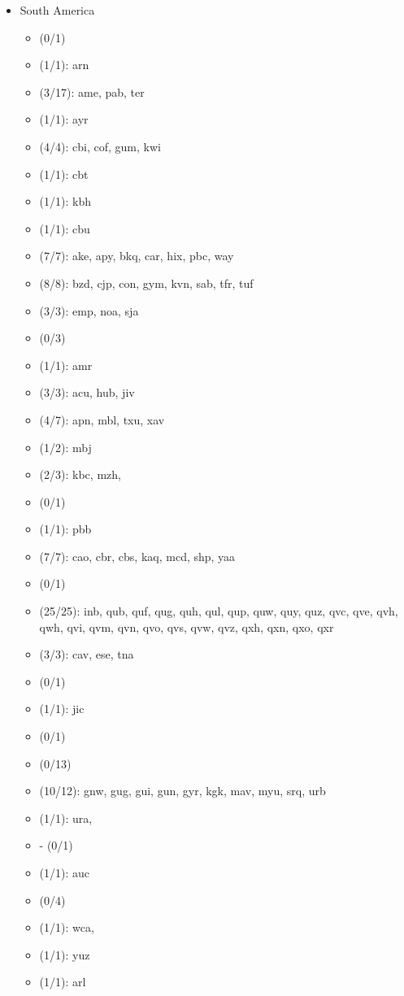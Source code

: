 \begin{itemize}[label={},leftmargin=0cm,labelindent=5pt,itemindent=0pt]
  \item South America
    \begin{itemize}[label={},leftmargin=!,labelindent=5pt,itemindent=-15pt]
  	\item {} (0/1)
  	\item {} (1/1): arn
  	\item {} (3/17): ame, pab, ter
  	\item {} (1/1): ayr
  	\item {} (4/4): cbi, cof, gum, kwi
  	\item {} (1/1): cbt
  	\item {} (1/1): kbh
  	\item {} (1/1): cbu
  	\item {} (7/7): ake, apy, bkq, car, hix, pbc, way
  	\item {} (8/8): bzd, cjp, con, gym, kvn, sab, tfr, tuf
  	\item {} (3/3): emp, noa, sja
  	\item {} (0/3)
  	\item {} (1/1): amr
  	\item {} (3/3): acu, hub, jiv
  	\item {} (4/7): apn, mbl, txu, xav
  	\item {} (1/2): mbj
  	\item {} (2/3): kbc, mzh,
  	\item {} (0/1)
  	\item {} (1/1): pbb
  	\item {} (7/7): cao, cbr, cbs, kaq, mcd, shp, yaa
  	\item {} (0/1)
  	\item {} (25/25): inb, qub, quf, qug, quh, qul, qup, quw, quy, quz, qvc, qve, qvh, qwh, qvi, qvm, qvn, qvo, qvs, qvw, qvz, qxh, qxn, qxo, qxr
  	\item {} (3/3): cav, ese, tna
  	\item {} (0/1)
  	\item {} (1/1): jic
  	\item {} (0/1)
  	\item {} (0/13)
  	\item {} (10/12): gnw, gug, gui, gun, gyr, kgk, mav, myu, srq, urb
  	\item {} (1/1): ura,
  	\item {}- (0/1)
  	\item {} (1/1): auc
  	\item {} (0/4)
  	\item {} (1/1): wca,
  	\item {} (1/1): yuz
  	\item {} (1/1): arl
    \end{itemize}

\end{itemize}
